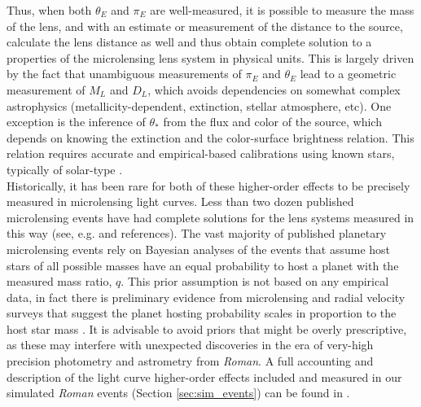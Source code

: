 \documentclass[twocolumn]{aastex631}
\begin{document}
\indent Thus, when both $\theta_E$ and $\pi_E$ are well-measured, it is possible to measure the mass of the lens, and with an estimate or measurement of the distance to the source, calculate the lens distance as well and thus obtain complete solution to a properties of the microlensing lens system in physical units. This is largely driven by the fact that unambiguous measurements of $\pi_E$ and $\theta_E$ lead to a geometric measurement of $M_L$ and $D_L$, which avoids dependencies on somewhat complex astrophysics (metallicity-dependent, extinction, stellar atmosphere, etc). One exception is the inference of $\theta_*$ from the flux and color of the source, which depends on knowing the extinction and the color-surface brightness relation. This relation requires accurate and empirical-based calibrations using known stars, typically of solar-type \citep{boyajian:2014a}. \\
\indent Historically, it has been rare for both of these higher-order effects to be precisely measured in microlensing light curves. Less than two dozen published microlensing events have had complete solutions for the lens systems measured in this way (see, e.g. \citealt{han:2025a} and references). The vast majority of published planetary microlensing events rely on Bayesian analyses of the events that assume host stars of all possible masses have an equal probability to host a planet with the measured mass ratio, $q$. This prior assumption is not based on any empirical data, in fact there is preliminary evidence from microlensing and radial velocity surveys that suggest the planet hosting probability scales in proportion to the host star mass \citep{nunota:2024a, bennett:inprep}. It is  advisable to avoid priors that might be overly prescriptive, as these may interfere with unexpected discoveries in the era of very-high precision photometry and astrometry from \textit{Roman}. A full accounting and description of the light curve higher-order effects included and measured in our simulated \textit{Roman} events (Section \ref{sec:sim_events}) can be found in \cite{zohrabi:inprep}.
\end{document}
